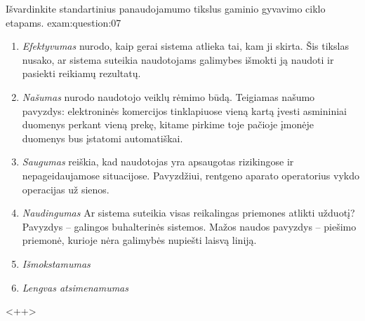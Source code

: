 \begin{question}{%
  Išvardinkite standartinius panaudojamumo tikslus gaminio gyvavimo ciklo
  etapams.
  }{exam:question:07}
  \begin{enumerate}
    \item \emph{Efektyvumas} nurodo, kaip gerai sistema  atlieka tai, kam ji skirta. 
      Šis tikslas nusako, ar sistema suteikia naudotojams galimybes išmokti ją 
      naudoti ir pasiekti reikiamų rezultatų.
    \item \emph{Našumas} nurodo naudotojo veiklų rėmimo būdą. Teigiamas našumo pavyzdys: 
      elektroninės komercijos tinklapiuose vieną kartą įvesti asmininiai duomenys 
      perkant vieną prekę, kitame pirkime toje pačioje įmonėje duomenys bus įstatomi 
      automatiškai.
    \item \emph{Saugumas} reiškia, kad naudotojas yra apsaugotas  rizikingose ir 
      nepageidaujamose situacijose. Pavyzdžiui, rentgeno aparato operatorius vykdo 
      operacijas už sienos.
    \item \emph{Naudingumas}  Ar sistema suteikia visas reikalingas priemones 
      atlikti užduotį? Pavyzdys – galingos buhalterinės sistemos. Mažos naudos 
      pavyzdys – piešimo priemonė, kurioje nėra galimybės nupiešti laisvą liniją.
    \item \emph{Išmokstamumas}
    \item \emph{Lengvas atsimenamumas}
  \end{enumerate}
  <++>
\end{question}

